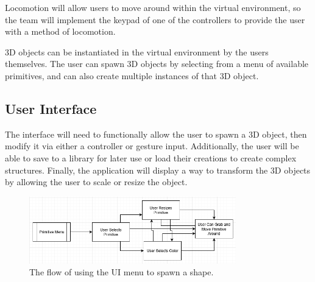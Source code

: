 \documentclass[draftclsnofoot,onecolumn,compsoc]{IEEEtran}
\begin{document}
Locomotion will allow users to move around within the virtual environment, so the team will implement the keypad of one of the controllers to provide the user with a method of locomotion.

3D objects can be instantiated in the virtual environment by the users themselves. The user can spawn 3D objects by selecting from a menu of available primitives, and can also create multiple instances of that 3D object.


\subsection{User Interface}

The interface will need to functionally allow the user to spawn a 3D object, then modify it via either a controller or gesture input. Additionally, the user will be able to save to a library for later use or load their creations to create complex structures. Finally, the application will display a way to transform the 3D objects by allowing the user to scale or resize the object. 

\begin{figure}[h]
  \centering
    \includegraphics[width=0.8\textwidth]{new_menu}
    \caption{The flow of using the UI menu to spawn a shape. }
\end{figure}
\end{document}
